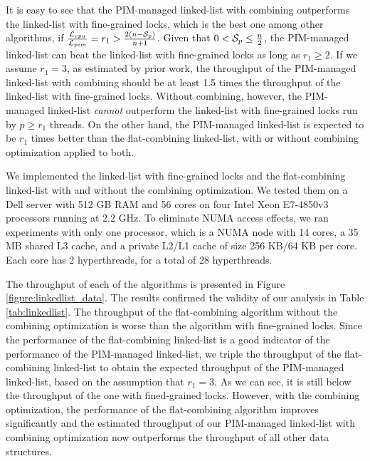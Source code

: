 It is easy to see that the PIM-managed linked-list with combining outperforms 
the linked-list with fine-grained locks, which is the best one among other algorithms, 
if ${\mathcal{L}_{cpu} \over \mathcal{L}_{pim}} = r_1 > {2(n - \mathcal{S}_{p})\over n + 1}$.
Given that $0 < \mathcal{S}_{p} \le {n \over 2}$, 
the PIM-managed linked-list can beat the linked-list with fine-grained locks as long as $r_1 \ge 2$. 
If we assume $r_1 = 3$, as estimated by prior work, the throughput of the PIM-managed linked-list with combining should be at least 1.5 times the throughput of the linked-list with fine-grained locks.
Without combining, however, the PIM-managed linked-list \emph{cannot}
outperform the linked-list with fine-grained locks run by $p \ge r_1$ threads.
On the other hand, the PIM-managed linked-list is expected to be $r_1$ times better than 
the flat-combining linked-list, with or without combining optimization applied to both.  

We implemented the linked-list with fine-grained locks and the flat-combining linked-list 
with and without the combining optimization.
We tested them on a Dell server with 512 GB RAM and 
56 cores on four Intel Xeon E7-4850v3 processors running at 2.2 GHz.
To eliminate NUMA access effects, we ran experiments with only one processor, 
which is a NUMA node with 14 cores, a 35 MB shared L3 cache, 
and a private L2/L1 cache of size 256 KB/64 KB per core. 
Each core has 2 hyperthreads, for a total of 28 hyperthreads. 

The throughput of each of the algorithms is presented in Figure \ref{figure:linkedlist_data}.
The results confirmed the validity of our analysis in Table \ref{tab:linkedlist}.
The throughput of the flat-combining algorithm without the combining optimization
is worse than the algorithm with fine-grained locks.
Since the performance of the flat-combining linked-list is a good 
indicator of the performance of the PIM-managed linked-list, 
we triple the throughput of the flat-combining linked-list to obtain the expected throughput 
of the PIM-managed linked-list, based on the assumption that $r_1 = 3$. 
As we can see, it is still below the throughput of the one with fined-grained locks.
However, with the combining optimization, the performance of the flat-combining
algorithm improves significantly and the estimated throughput of our PIM-managed
linked-list with combining optimization now outperforms the throughput of all other data structures.

